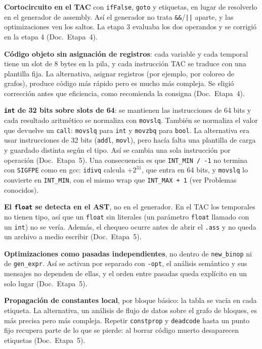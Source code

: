 \documentclass[11pt,a4paper]{article}
\newcommand{\code}[1]{\texttt{#1}}
\newcommand{\doc}[1]{(Doc.\ Etapa~#1)}
\begin{document}
\textbf{Cortocircuito en el TAC} con \code{ifFalse}, \code{goto} y etiquetas, en lugar de resolverlo en el generador de assembly. Así el generador no trata \code{\&\&}/\code{||} aparte, y las optimizaciones ven los saltos. La etapa 3 evaluaba los dos operandos y se corrigió en la etapa 4 \doc{4}.

\textbf{Código objeto sin asignación de registros}: cada variable y cada temporal tiene un slot de 8 bytes en la pila, y cada instrucción TAC se traduce con una plantilla fija. La alternativa, asignar registros (por ejemplo, por coloreo de grafos), produce código más rápido pero es mucho más compleja. Se eligió corrección antes que eficiencia, como recomienda la consigna \doc{4}.

\textbf{\code{int} de 32 bits sobre slots de 64}: se mantienen las instrucciones de 64 bits y cada resultado aritmético se normaliza con \code{movslq}. También se normaliza el valor que devuelve un \code{call}: \code{movslq} para \code{int} y \code{movzbq} para \code{bool}. La alternativa era usar instrucciones de 32 bits (\code{addl}, \code{movl}), pero hacía falta una plantilla de carga y guardado distinta según el tipo. Así se cambia una sola instrucción por operación \doc{5}. Una consecuencia es que \code{INT\_MIN / -1} no termina con \code{SIGFPE} como en gcc: \code{idivq} calcula $+2^{31}$, que entra en 64 bits, y \code{movslq} lo convierte en \code{INT\_MIN}, con el mismo wrap que \code{INT\_MAX + 1} (ver Problemas conocidos).

\textbf{El \code{float} se detecta en el AST}, no en el generador. En el TAC los temporales no tienen tipo, así que un \code{float} sin literales (un parámetro \code{float} llamado con un \code{int}) no se vería. Además, el chequeo ocurre antes de abrir el \code{.ass} y no queda un archivo a medio escribir \doc{5}.

\textbf{Optimizaciones como pasadas independientes}, no dentro de \code{new\_binop} ni de \code{gen\_expr}. Así se activan por separado con \code{-opt}, el análisis semántico y sus mensajes no dependen de ellas, y el orden entre pasadas queda explícito en un solo lugar \doc{5}.

\textbf{Propagación de constantes local}, por bloque básico: la tabla se vacía en cada etiqueta. La alternativa, un análisis de flujo de datos sobre el grafo de bloques, es más precisa pero más compleja. Repetir \code{constprop} y \code{deadcode} hasta un punto fijo recupera parte de lo que se pierde: al borrar código muerto desaparecen etiquetas \doc{5}.
\end{document}
